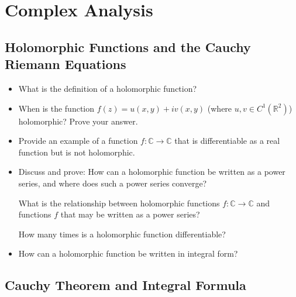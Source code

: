 



\tableofcontents

\section{Complex Analysis}

\subsection{Holomorphic Functions and the Cauchy Riemann Equations}

\begin{itemize}

	\item What is the definition of a holomorphic function?
	
	\item When is the function $ f(z) = u(x, y) + iv(x, y) $ (where $ u, v \in C^{1}(\mathbb{R}^2)$) holomorphic? Prove your answer. 
	
	\item Provide an example of a function $ f: \mathbb{C} \to \mathbb{C} $ that is differentiable as a real function but is not holomorphic.
	
	\item Discuss and prove: How can a holomorphic function be written as a power series, and where does such a power series converge?
	
	What is the relationship between holomorphic functions $ f:\mathbb{C} \to \mathbb{C} $ and functions $ f $ that may be written as a power series?
	
	How many times is a holomorphic function differentiable? 
	
	 \item How can a holomorphic function be written in integral form? 

\end{itemize}

\subsection{Cauchy Theorem and Integral Formula}

